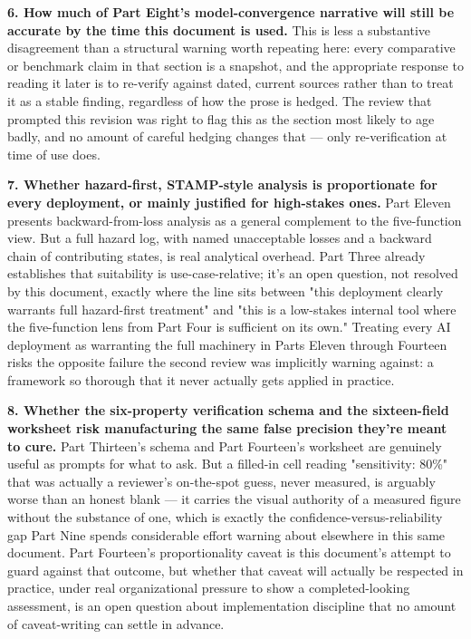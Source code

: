 \textbf{6. How much of Part Eight's model-convergence narrative will still be accurate by the time this document is used.} This is less a substantive disagreement than a structural warning worth repeating here: every comparative or benchmark claim in that section is a snapshot, and the appropriate response to reading it later is to re-verify against dated, current sources rather than to treat it as a stable finding, regardless of how the prose is hedged. The review that prompted this revision was right to flag this as the section most likely to age badly, and no amount of careful hedging changes that --- only re-verification at time of use does.

\textbf{7. Whether hazard-first, STAMP-style analysis is proportionate for every deployment, or mainly justified for high-stakes ones.} Part Eleven presents backward-from-loss analysis as a general complement to the five-function view. But a full hazard log, with named unacceptable losses and a backward chain of contributing states, is real analytical overhead. Part Three already establishes that suitability is use-case-relative; it's an open question, not resolved by this document, exactly where the line sits between "this deployment clearly warrants full hazard-first treatment" and "this is a low-stakes internal tool where the five-function lens from Part Four is sufficient on its own." Treating every AI deployment as warranting the full machinery in Parts Eleven through Fourteen risks the opposite failure the second review was implicitly warning against: a framework so thorough that it never actually gets applied in practice.

\textbf{8. Whether the six-property verification schema and the sixteen-field worksheet risk manufacturing the same false precision they're meant to cure.} Part Thirteen's schema and Part Fourteen's worksheet are genuinely useful as prompts for what to ask. But a filled-in cell reading "sensitivity: 80\%" that was actually a reviewer's on-the-spot guess, never measured, is arguably worse than an honest blank --- it carries the visual authority of a measured figure without the substance of one, which is exactly the confidence-versus-reliability gap Part Nine spends considerable effort warning about elsewhere in this same document. Part Fourteen's proportionality caveat is this document's attempt to guard against that outcome, but whether that caveat will actually be respected in practice, under real organizational pressure to show a completed-looking assessment, is an open question about implementation discipline that no amount of caveat-writing can settle in advance.

